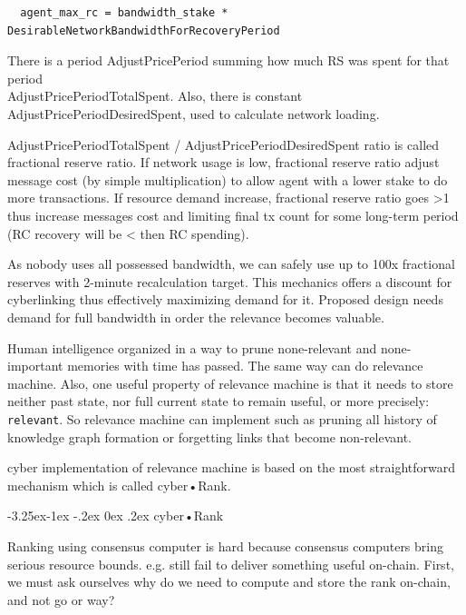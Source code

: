 \documentclass[8pt,oneside]{amsart}
\makeatletter
\newcommand{\linkgreen}[2]{\href{#1}{\color{green}{#2}}}
\renewcommand\subsection{\@startsection{subsection}{2}{\z@}%
                                     {-3.25ex\@plus -1ex \@minus -.2ex}%
                                     {0ex \@plus .2ex}%
                                     {\play\Large}}%
\newcommand{\titleSection}[1]{\subsection{#1}}
\newcommand{\code}[1]{{\PlayBold #1}}
\makeatother
\begin{document}
\begin{lstlisting}
  agent_max_rc = bandwidth_stake * DesirableNetworkBandwidthForRecoveryPeriod
\end{lstlisting}

There is a period \code{AdjustPricePeriod} summing how much RS was spent for that period\\ \code{AdjustPricePeriodTotalSpent}. Also, there is constant \code{AdjustPricePeriodDesiredSpent}, used to calculate network loading.

\code{AdjustPricePeriodTotalSpent / AdjustPricePeriodDesiredSpent} ratio is called fractional reserve ratio. If network usage is low, fractional reserve ratio adjust message cost (by simple multiplication) to allow agent with a lower stake to do more transactions. If resource demand increase, fractional reserve ratio goes \code{>1} thus increase messages cost and limiting final tx count for some long-term period (RC recovery will be \code{<} then RC spending).

As nobody uses all possessed bandwidth, we can safely use up to 100x fractional reserves with 2-minute recalculation target. This mechanics offers a discount for cyberlinking thus effectively maximizing demand for it. Proposed design needs demand for full bandwidth in order the relevance becomes valuable.

Human intelligence organized in a way to prune none-relevant and none-important memories with time has passed. The same way can do relevance machine. Also, one useful property of relevance machine is that it needs to store neither past state, nor full current state to remain useful, or more precisely: \verb|relevant|. So relevance machine can implement \linkgreen{https://ipfs.io/ipfs/QmP81EcuNDZHQutvdcDjbQEqiTYUzU315aYaTyrVj6gtJb}{aggressive pruning strategies} such as pruning all history of knowledge graph formation or forgetting links that become non-relevant.




\code{cyber} implementation of relevance machine is based on the most straightforward mechanism which is called cyber•Rank.

\titleSection{cyber•Rank}\label{cyberRank}

Ranking using consensus computer is hard because consensus computers bring serious resource bounds. e.g. \linkgreen{https://ipfs.io/ipfs/QmWTZjDZNbBqcJ5b6VhWGXBQ5EQavKKDteHsdoYqB5CBjh}{Nebulas} still fail to deliver something useful on-chain. First, we must ask ourselves why do we need to compute and store the rank on-chain, and not go \linkgreen{https://ipfs.io/ipfs/QmZo7eY5UdJYotf3Z9GNVBGLjkCnE1j2fMdW2PgGCmvGPj}{Colony} or \linkgreen{https://ipfs.io/ipfs/QmTrxXp2xhB2zWGxhNoLgsztevqKLwpy5HwKjLjzFa7rnD}{Truebit} way?
\end{document}
